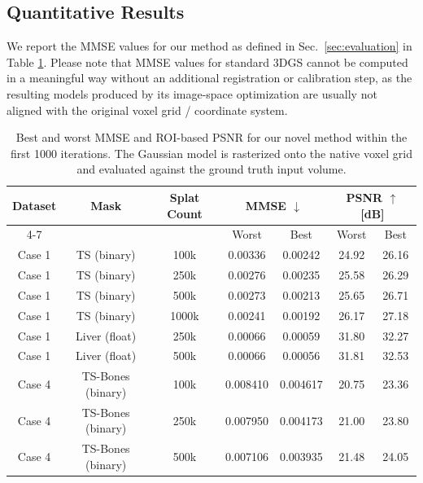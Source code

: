 \documentclass[runningheads]{llncs}
\begin{document}
\subsection{Quantitative Results}
We report the MMSE values for our method as defined in Sec.~\ref{sec:evaluation} in Table \ref{tab:mmse}. Please note that MMSE values for standard 3DGS cannot be computed in a meaningful way without an additional registration or calibration step, as the resulting models produced by its image-space optimization are usually not aligned with the original voxel grid / coordinate system.

\begin{table}
\centering
\caption{Best and worst MMSE and ROI-based PSNR for our novel method within the first 1000 iterations. The Gaussian model is rasterized onto the native voxel grid and evaluated against the ground truth input volume.}
\label{tab:mmse}
\setlength{\tabcolsep}{4pt}
\renewcommand{\arraystretch}{1.1}
\begin{tabular}{|c|c|c|c|c|c|c|}
\hline
Dataset & Mask & Splat Count & \multicolumn{2}{c|}{MMSE $\downarrow$} & \multicolumn{2}{c|}{PSNR $\uparrow$ [dB]} \\
\cline{4-7}
 & & & Worst & Best & Worst & Best \\
\hline
Case 1     & TS (binary)   & 100k   & 0.00336   & 0.00242   & 24.92     & 26.16 \\
Case 1     & TS (binary)   & 250k   & 0.00276   & 0.00235   & 25.58     & 26.29 \\
Case 1     & TS (binary)   & 500k   & 0.00273   & 0.00213   & 25.65     & 26.71 \\
Case 1     & TS (binary)   & 1000k  & 0.00241   & 0.00192   & 26.17     & 27.18 \\
Case 1     & Liver (float) & 250k   & 0.00066   & 0.00059   & 31.80     & 32.27 \\
Case 1     & Liver (float) & 500k   & 0.00066   & 0.00056   & 31.81     & 32.53 \\
Case 4     & TS-Bones (binary) & 100k   & 0.008410   & 0.004617   & 20.75     & 23.36 \\
Case 4     & TS-Bones (binary) & 250k   & 0.007950   & 0.004173   & 21.00     & 23.80 \\
Case 4     & TS-Bones (binary) & 500k   & 0.007106   & 0.003935   & 21.48     & 24.05 \\




\hline
\end{tabular}
\end{table}
\end{document}
